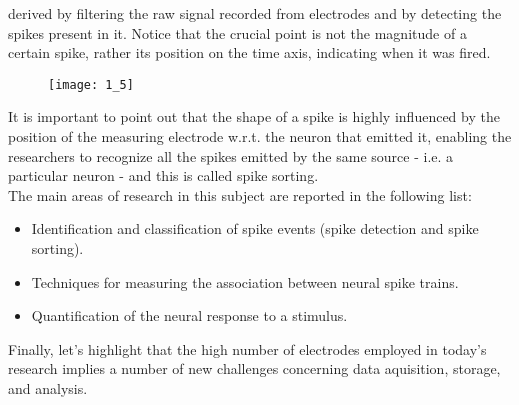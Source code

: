 derived by filtering the raw signal recorded from electrodes and by detecting the
spikes present in it. Notice that the crucial point is not the magnitude of a
certain spike, rather its position on the time axis, indicating when it was fired.
\begin{figure}[H]
    \texttt{[image: 1\_5]}
    \centering
\end{figure}
It is important to point out that the shape of a spike is highly influenced by the
position of the measuring electrode w.r.t. the neuron that emitted it, enabling
the researchers to recognize all the spikes emitted by the same source - i.e. a
particular neuron - and this is called spike sorting.\\
The main areas of research in this subject are reported in the following list:
\begin{itemize}
    \item Identification and classification of spike events (spike detection and
    spike sorting).
    \item Techniques for measuring the association between neural spike trains.
    \item Quantification of the neural response to a stimulus.
\end{itemize}
Finally, let's highlight that the high number of electrodes employed in today's
research implies a number of new challenges concerning data aquisition, storage,
and analysis.